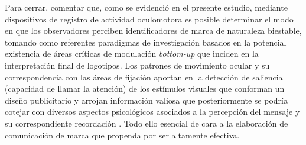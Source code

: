 \documentclass[spanish]{textolivre}
\begin{document}
Para cerrar, comentar que, como se evidenció en el presente estudio, mediante dispositivos de registro de actividad oculomotora es posible determinar el modo en que los observadores perciben identificadores de marca de naturaleza biestable, tomando como referentes paradigmas de investigación basados en la potencial existencia de áreas críticas de modulación \textit{bottom-up} que inciden en la interpretación final de logotipos. Los patrones de movimiento ocular y su correspondencia con las áreas de fijación aportan en la detección de saliencia (capacidad de llamar la atención) de los estímulos visuales que conforman un diseño publicitario \cite{ghosh_measuring_2013} y arrojan información valiosa que posteriormente se podría cotejar con diversos aspectos psicológicos asociados a la percepción del mensaje y su correspondiente recordación \cite{adil_face_2018}. Todo ello esencial de cara a la elaboración de comunicación de marca que propenda por ser altamente efectiva.
\end{document}
